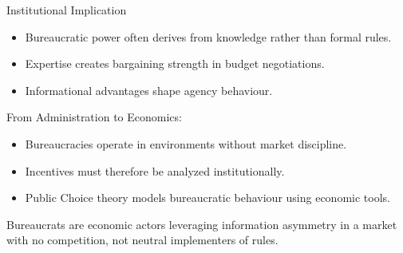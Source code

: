 \documentclass[10pt]{beamer}
\begin{document}
\begin{frame}{Institutional Implication}
\begin{itemize}
\item Bureaucratic power often derives from knowledge rather than formal rules.
\item Expertise creates bargaining strength in budget negotiations.
\item Informational advantages shape agency behaviour.
\end{itemize}

\alert{From Administration to Economics:}
\begin{itemize}
\item Bureaucracies operate in environments without market discipline.
\item Incentives must therefore be analyzed institutionally.
\item Public Choice theory models bureaucratic behaviour using economic tools. 
\end{itemize}
\alert{Bureaucrats are economic actors leveraging information asymmetry in a market with no competition, not neutral implementers of rules.}
\end{frame}
\end{document}
